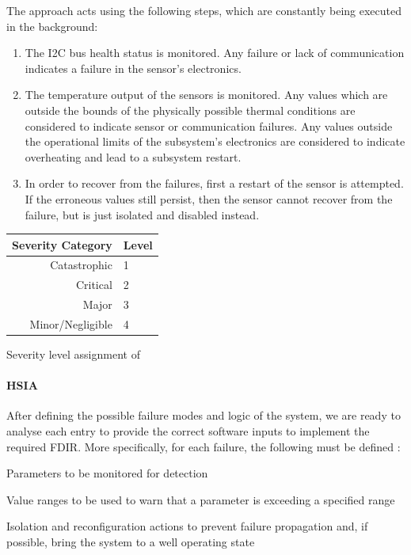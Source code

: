 \documentclass[a4paper,nobib]{tufte-book}
\begin{document}
The approach acts using the following steps, which are constantly being executed in the background:
\begin{enumerate}
	\item The \ac{I2C} bus health status is monitored. Any failure or lack of communication indicates a failure in the sensor's electronics.
	\item The temperature output of the sensors is monitored. Any values which are outside the bounds of the physically possible thermal conditions are considered to indicate sensor or communication failures. Any values outside the operational limits of the subsystem's electronics are considered to indicate overheating and lead to a subsystem restart.
	\item In order to recover from the failures, first a restart of the sensor is attempted. If the erroneous values still persist, then the sensor cannot recover from the failure, but is just isolated and disabled instead.
\end{enumerate}

\begin{margintable}
	\begin{tabularx}{\linewidth}{@{}rX@{}}
		\toprule
		Severity Category & Level\\ \midrule
		Catastrophic & 1 \\
		Critical & 2 \\
		Major & 3 \\
		Minor/Negligible & 4 \\ \bottomrule
	\end{tabularx}
	\caption{Severity level assignment of }
\end{margintable}

\clearpage
\paragraph{\acl{HSIA}}

After defining the possible failure modes and logic of the system, we are ready to analyse each entry to provide the correct software inputs to implement the required \ac{FDIR}. More specifically, for each failure, the following must be defined \autocite[84]{SAVOIR-HB-003}:
\begin{compactitem}
	\item Parameters to be monitored for detection
	\item Value ranges to be used to warn that a parameter is exceeding a specified range
	\item Isolation and reconfiguration actions to prevent failure propagation and, if possible, bring the system to a well operating state
\end{compactitem}
\end{document}

